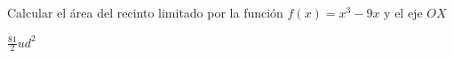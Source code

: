 \documentclass[addpoints,spanish, 12pt,a4paper]{exam}
\begin{document}
\begin{questions}

\question[2]   Calcular el área del recinto limitado por la función $f(x)=x^3-9x$ y el eje $OX$
\begin{solution}
    $\frac{81}{2}ud^2$
\end{solution}







\end{questions}
\end{document}
